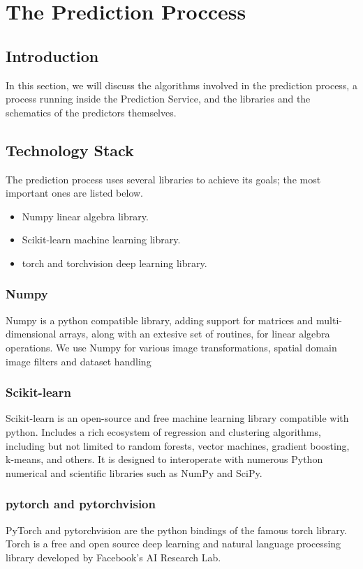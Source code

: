 \chapter{The Prediction Proccess}
\label{prediction-process}
	\section{Introduction}
		In this section, we will discuss the algorithms involved in the prediction process, a process running inside the Prediction Service, 
		and the libraries and the schematics of the predictors themselves.
	\section{Technology Stack}
		The prediction process uses several libraries to achieve its goals; the most important ones are listed below.
		\begin{itemize}
			\item Numpy linear algebra library.
			\item Scikit-learn machine learning library.
			\item torch and torchvision deep learning library.
		\end{itemize}
		\subsection{Numpy}
			\label{numpy}
			Numpy is a python compatible library, adding support for matrices and multi-dimensional arrays, along with an 
			extesive set of routines, for linear algebra operations. We use Numpy for various image transformations, spatial 
			domain image filters and dataset handling
		\subsection{Scikit-learn}
			Scikit-learn is an open-source and free machine learning library compatible with python. Includes a rich 
			ecosystem of regression and clustering algorithms, including but not limited to random forests, vector machines, 
			gradient boosting, k-means, and others. It is designed to interoperate with numerous Python numerical and scientific 
			libraries such as NumPy and SciPy.
		\subsection{pytorch and pytorchvision}
			PyTorch and pytorchvision are the python bindings of the famous torch library. Torch is a free and 
			open source deep learning and natural language processing library developed by Facebook's AI Research Lab.
